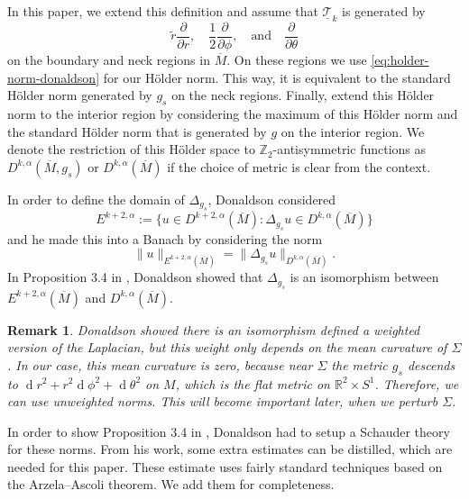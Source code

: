 \documentclass[preprint,12pt]{elsarticle}
\numberwithin{table}{section}
\newtheorem{remark}[lemma]{Remark}
\newcommand{\Z}{\mathbb{Z}}
\newcommand{\R}{\mathbb{R}}
\newcommand{\del}{\partial}
\renewcommand{\d}{\operatorname{d}\!}
\begin{document}
In this paper, we extend this definition and assume that $\underline{\mathcal{T}}_k$ is generated by
\begin{equation}
	\label{eq:my-holder-norm}
	\tilde{r}\frac{\del}{\del r}, \quad \frac{1}{2}\frac{\del }{\del \phi}, \quad \text{and} \quad \frac{\del}{\del \theta}
\end{equation}
on the boundary and neck regions in $\overline{M}$. On these regions we use \cref{eq:holder-norm-donaldson} for our H\"older norm. This way, it is equivalent to the standard H\"older norm generated by $g_s$ on the neck regions. Finally, extend this H\"older norm to the interior region by considering the maximum of this H\"older norm and the standard H\"older norm that is generated by $g$ on the interior region.
We denote the restriction of this H\"older space to $\Z_2$-antisymmetric functions as $D^{k, \alpha}(\overline{M}, g_s)$ or $D^{k, \alpha}(\overline{M})$ if the choice of metric is clear from the context.

In order to define the domain of $\Delta_{g_s}$, Donaldson \cite{Donaldson2021} considered
$$E^{k+2, \alpha} := \{
	u \in D^{k+2, \alpha}(\overline{M}) \colon \Delta_{g_s} u \in D^{k, \alpha}(\overline{M})
\}$$
and he made this into a Banach by considering the norm 
$$
\|u\|_{E^{k+2, \alpha}(\overline{M})} = \|\Delta_{g_s} u\|_{D^{k, \alpha}(\overline{M})}.
$$
In Proposition 3.4 in \cite{Donaldson2021}, Donaldson showed that $\Delta_{g_s}$ is an isomorphism between $E^{k+2, \alpha}(\overline{M})$ and $D^{k, \alpha}(\overline{M})$.

\begin{remark}
	Donaldson showed there is an isomorphism defined a weighted version of the Laplacian, but this weight only depends on the mean curvature of $\Sigma$. In our case, this mean curvature is zero, because near $\Sigma$ the metric $g_s$ descends to $\d r^2 + r^2 \d \phi^2 + \d \theta^2$ on $M$, which is the flat metric on $\R^2 \times S^1$. Therefore, we can use unweighted norms. This will become important later, when we perturb $\Sigma$.
\end{remark}
In order to show Proposition 3.4 in \cite{Donaldson2021}, Donaldson \cite{Donaldson2021} had to setup a Schauder theory for these norms. From his work, some extra estimates can be distilled, which are needed for this paper. These estimate uses fairly standard techniques based on the Arzela--Ascoli  theorem. We add them for completeness.
\end{document}

